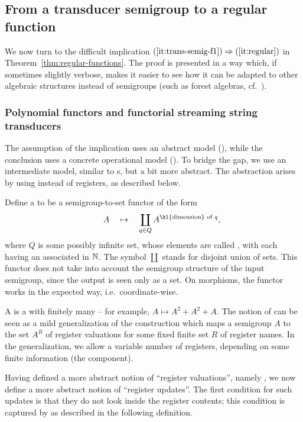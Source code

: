 \subsection{From a transducer semigroup to a regular function}
\label{sec:hard}
We now turn to the difficult implication $(\ref{it:trans-semig-f1}) \Rightarrow (\ref{it:regular})$ in Theorem~\ref{thm:regular-functions}. 
 The proof is presented in a way which, if sometimes slightly verbose, makes it
 easier to see how it can be adapted to other algebraic structures instead of
 semigroups (such as forest algebras, cf.~).

\subsubsection{Polynomial functors and functorial streaming string transducers}
\label{sec:abstract-sst} 
The assumption of the implication uses an abstract model (), while the conclusion uses a concrete operational model (). To bridge the gap, we use an intermediate model, similar to \sst{}s, but a bit more abstract. The abstraction arises by using  instead of registers, as described below. 

\AP Define a  to be a semigroup-to-set functor of the form
\begin{align*}
\qquad A \quad \mapsto \quad \coprod_{q \in Q} A^{\text{\kl{dimension} of } q},
\end{align*}
where $Q$ is some possibly infinite set, whose elements are called , with each  having an associated  in ${\mathbb N}$. The symbol $\coprod$ stands for disjoint union of sets. This functor does not take into account the semigroup structure of the input semigroup, since the output is seen only as a set.
On morphisms, the functor works in the expected way, i.e.~coordinate-wise.  

\AP A  is a  with finitely many  -- for example, $A \mapsto A^2 + A^2 + A$. 
The notion of  can be seen as a mild generalization of the construction which maps a semigroup $A$ to the set $A^R$ of register valuations for some fixed finite set $R$ of register names.  In the generalization, we allow a variable number of registers, depending on some finite information (the component). 

Having defined a more abstract notion of \enquote{register valuations}, namely , we now define a more abstract notion of \enquote{register updates}. The first condition for such updates is that they do not look inside the register contents; this condition is captured by  as described in the following definition. 



